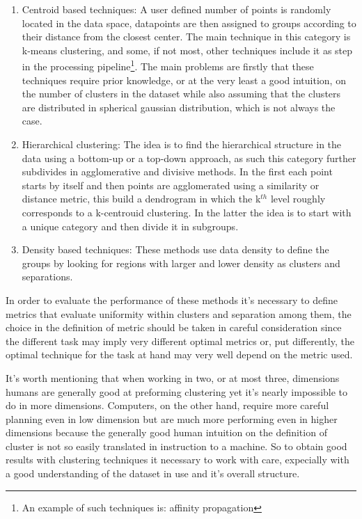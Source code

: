 \begin{enumerate}
\item Centroid based techniques: A user defined number of points is randomly located in the data space, datapoints are then assigned to groups according to their distance from the closest center. The main technique in this category is k-means clustering, and some, if not most, other techniques include it as step in the processing pipeline\footnote{An example of such techniques is: affinity propagation}. The main problems are firstly that these techniques require prior knowledge, or at the very least a good intuition, on the number of clusters in the dataset  while also assuming that the clusters are distributed in spherical gaussian distribution, which is not always the case.
\item Hierarchical clustering: The idea is to find the hierarchical structure in the data using a bottom-up or a top-down approach, as such this category further subdivides in agglomerative and divisive methods. In the first each point starts by itself and then points are agglomerated using a similarity or distance metric, this build a dendrogram in which the k$^{th}$ level roughly corresponds to a k-centrouid clustering. In the latter the idea is to start with a unique category and then divide it in subgroups.
\item Density based techniques: These methods use data density to define the groups by looking for regions with larger and lower density as clusters and separations.
\end{enumerate}

In order to evaluate the performance of these methods it's necessary to define metrics that evaluate uniformity within clusters and separation among them, the choice in the definition of metric should be taken in careful consideration since the different task may imply very different optimal metrics or, put differently, the optimal technique for the task at hand may very well depend on the metric used.

It's worth mentioning that when working in two, or at most three, dimensions humans are generally good at preforming clustering yet it's nearly impossible to do in more dimensions. Computers, on the other hand, require more careful planning even in low dimension but are much more performing even in higher dimensions because the generally good human intuition on the definition of cluster is not so easily translated in instruction to a machine. So to obtain good results with clustering techniques it necessary to work with care, expecially with a good understanding of the dataset in use and it's overall structure.

